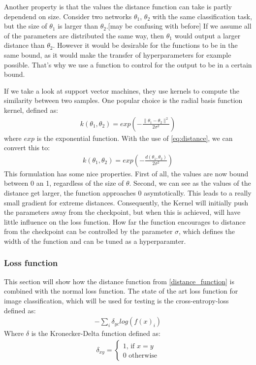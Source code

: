Another property is that the values the distance function can take is partly
dependend on size. Consider two networks $\theta_1$, $\theta_2$ with the same
classification task, but the size of $\theta_1$ is larger than $\theta_2$.[may
be confusing with before] If we assume all of the parameters are distributed the
same way, then $\theta_1$ would output a larger distance than $\theta_2$.
However it would be desirable for the functions to be in the same bound, as it
would make the transfer of hyperparameters for example possible. That's why we
use a function to control for the output to be in a certain bound.

If we take a look at support vector machines, they use kernels to compute the
similarity between two samples. One popular choice is the radial basis function
kernel, defined as:
\begin{align}
    k(\theta_1, \theta_2)=exp(-\frac{\rVert \theta_1 - \theta_2 \lVert^2}{2\sigma^2})
\end{align}
where $exp$ is the exponential function.
With the use of \ref{eq:distance}, we can convert this to:
\begin{align}
    k(\theta_1, \theta_2)=exp(-\frac{d(\theta_1, \theta_2)}{2\sigma^2})
\end{align}
This formulation has some nice properties. First of all, the values are now
bound between 0 an 1, regardless of the size of $\theta$. Second, we can see as
the values of the distance get larger, the function approaches 0 asymtotically.
This leads to a really small gradient for extreme distances. Consequently, the
Kernel will initially push the parameters away from the checkpoint, but when
this is achieved, will have little influence on the loss function. How far the
function encourages to distance from the checkpoint can be controlled by the
parameter $\sigma$, which defines the width of the function and can be tuned as
a hyperparamter.


\subsubsection{Loss function}
This section will show how the distance function from \ref{distance_function} is
combined with the normal loss function. The state of the art loss function for
image classification, which will be used for testing is the cross-entropy-loss
defined as:
\begin{align}
    -\sum_{i} \delta_{yc} log(f(x)_i)
\end{align}
Where $\delta$ is the Kronecker-Delta function defined as:
\begin{align}
    \delta_{xy} =
    \begin{cases}
        1 \textrm{, if } x=y \\
        0 \textrm{ otherwise}
    \end{cases}
\end{align}

